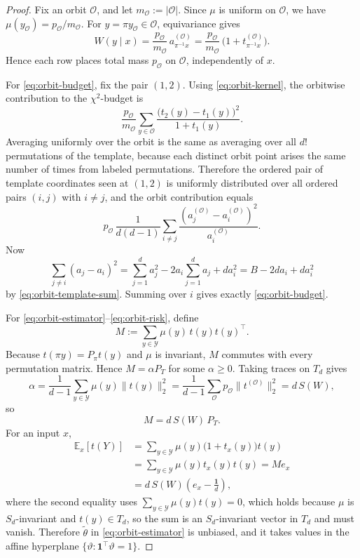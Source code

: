 \documentclass[11pt]{amsart}
\numberwithin{equation}{section}
\theoremstyle{definition}
\newcommand{\E}{\mathbb E}
\newcommand{\one}{\mathbf 1}
\begin{document}
\begin{proof}
Fix an orbit \(\mathcal O\), and let \(m_{\mathcal O}:=|\mathcal O|\).
Since \(\mu\) is uniform on \(\mathcal O\), we have
\(
\mu(y_{\mathcal O})=p_{\mathcal O}/m_{\mathcal O}
\).
For \(y=\pi y_{\mathcal O}\in\mathcal O\), equivariance gives
\[
W(y\mid x)
=
\frac{p_{\mathcal O}}{m_{\mathcal O}}\,
a^{(\mathcal O)}_{\pi^{-1}x}
=
\frac{p_{\mathcal O}}{m_{\mathcal O}}\,
\bigl(1+t^{(\mathcal O)}_{\pi^{-1}x}\bigr). \tag{11.7}\label{eq:orbit-kernel}
\]
Hence each row places total mass \(p_{\mathcal O}\) on \(\mathcal O\), independently of \(x\).

For \eqref{eq:orbit-budget}, fix the pair \((1,2)\).
Using \eqref{eq:orbit-kernel}, the orbitwise contribution to the \(\chi^2\)-budget is
\[
\frac{p_{\mathcal O}}{m_{\mathcal O}}
\sum_{y\in\mathcal O}
\frac{\bigl(t_2(y)-t_1(y)\bigr)^2}{1+t_1(y)}.
\]
Averaging uniformly over the orbit is the same as averaging over all \(d!\) permutations of the template,
because each distinct orbit point arises the same number of times from labeled permutations.
Therefore the ordered pair of template coordinates seen at \((1,2)\) is uniformly distributed over all
ordered pairs \((i,j)\) with \(i\neq j\), and the orbit contribution equals
\[
p_{\mathcal O}\,
\frac{1}{d(d-1)}
\sum_{i\neq j}
\frac{(a_j^{(\mathcal O)}-a_i^{(\mathcal O)})^2}{a_i^{(\mathcal O)}}.
\]
Now
\[
\sum_{j\neq i}(a_j-a_i)^2
=
\sum_{j=1}^d a_j^2-2a_i\sum_{j=1}^d a_j+d a_i^2
=
B-2d a_i+d a_i^2
\]
by \eqref{eq:orbit-template-sum}.
Summing over \(i\) gives exactly \eqref{eq:orbit-budget}.

For \eqref{eq:orbit-estimator}--\eqref{eq:orbit-risk}, define
\[
M:=\sum_{y\in\mathcal Y}\mu(y)\,t(y)t(y)^\top.
\]
Because \(t(\pi y)=P_\pi t(y)\) and \(\mu\) is invariant, \(M\) commutes with every permutation matrix.
Hence
\(
M=\alpha P_T
\)
for some \(\alpha\ge 0\).
Taking traces on \(T_d\) gives
\[
\alpha
=
\frac{1}{d-1}\sum_{y\in\mathcal Y}\mu(y)\|t(y)\|_2^2
=
\frac{1}{d-1}\sum_{\mathcal O} p_{\mathcal O}\|t^{(\mathcal O)}\|_2^2
=
d\,S(W), \tag{11.8}\label{eq:orbit-matrix}
\]
so
\[
M=d\,S(W)\,P_T.
\]
For an input \(x\),
\[
\begin{aligned}
\E_x[t(Y)]
&=
\sum_{y\in\mathcal Y}\mu(y)\bigl(1+t_x(y)\bigr)t(y)\\
&=
\sum_{y\in\mathcal Y}\mu(y)t_x(y)t(y)
=
M e_x\\
&=
d\,S(W)\left(e_x-\frac{\one}{d}\right),
\end{aligned}
\]
where the second equality uses \(\sum_{y\in\mathcal Y}\mu(y)t(y)=0\), which holds because
\(\mu\) is \(S_d\)-invariant and \(t(y)\in T_d\), so the sum is an \(S_d\)-invariant vector in \(T_d\)
and must vanish.
Therefore \(\widetilde\theta\) in \eqref{eq:orbit-estimator} is unbiased,
and it takes values in the affine hyperplane
\(
\{\vartheta:\one^\top\vartheta=1\}.
\)


\end{proof}
\end{document}
